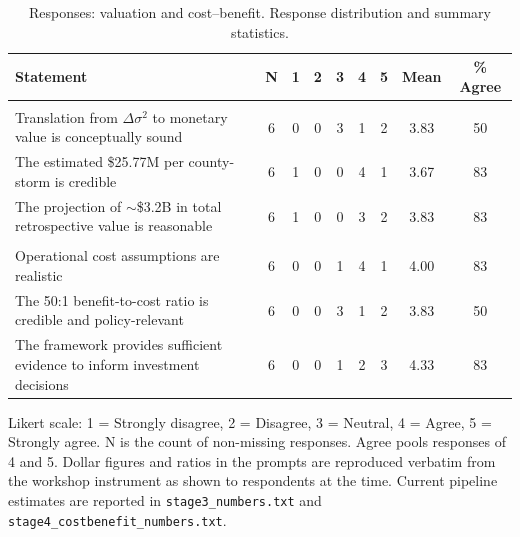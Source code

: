 \begin{table}[!h]

\caption{\label{tab:appD_likert_part2}Responses: valuation and cost--benefit. Response distribution and summary statistics.}
\centering
\begin{threeparttable}
\begin{tabular}[t]{lcccccccc}
\toprule
Statement & N & 1 & 2 & 3 & 4 & 5 & Mean & \% Agree\\
\midrule
\addlinespace[0.3em]
\multicolumn{9}{l}{\textbf{Valuation}}\\
\hspace{1em}Translation from $\Delta\sigma^2$ to monetary value is conceptually sound & 6 & 0 & 0 & 3 & 1 & 2 & 3.83 & 50\\
\hspace{1em}The estimated \$25.77M per county-storm is credible & 6 & 1 & 0 & 0 & 4 & 1 & 3.67 & 83\\
\hspace{1em}The projection of $\sim$\$3.2B in total retrospective value is reasonable & 6 & 1 & 0 & 0 & 3 & 2 & 3.83 & 83\\
\addlinespace[0.3em]
\multicolumn{9}{l}{\textbf{Cost--benefit}}\\
\hspace{1em}Operational cost assumptions are realistic & 6 & 0 & 0 & 1 & 4 & 1 & 4.00 & 83\\
\hspace{1em}The 50:1 benefit-to-cost ratio is credible and policy-relevant & 6 & 0 & 0 & 3 & 1 & 2 & 3.83 & 50\\
\hspace{1em}The framework provides sufficient evidence to inform investment decisions & 6 & 0 & 0 & 1 & 2 & 3 & 4.33 & 83\\
\bottomrule
\end{tabular}
\begin{tablenotes}[para]
\item Likert scale: 1 = Strongly disagree, 2 = Disagree, 3 = Neutral, 4 = Agree, 5 = Strongly agree. N is the count of non-missing responses. Agree pools responses of 4 and 5. Dollar figures and ratios in the prompts are reproduced verbatim from the workshop instrument as shown to respondents at the time. Current pipeline estimates are reported in \texttt{stage3\_numbers.txt} and \texttt{stage4\_costbenefit\_numbers.txt}.
\end{tablenotes}
\end{threeparttable}
\end{table}
